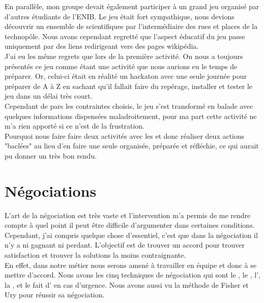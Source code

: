 {En parallèle, mon groupe devait également participer à un grand jeu organisé par d'autres étudiants de l'ENIB. Le jeu était fort sympathique, nous devions découvrir un ensemble de scientifiques par l'intermédiaire des rues et places de la technopôle. Nous avons cependant regretté que l'aspect éducatif du jeu passe uniquement par des liens redirigeant vers des pages wikipédia.\\

J'ai eu les même regrets que lors de la première activité. On nous a toujours présentés ce jeu comme étant une activité que nous aurions eu le temps de préparer. Or, celui-ci était en réalité un hackaton avec une seule journée pour préparer de A à Z en sachant qu'il fallait faire du repérage, installer et tester le jeu dans un délai très court.\\
Cependant de pars les contraintes choisis, le jeu s'est transformé en balade avec quelques informations dispensées maladroitement, pour ma part cette activité ne m'a rien apporté si ce n'est de la frustration.\\

Pourquoi nous faire faire deux activités avec les \pd et donc réaliser deux actions "baclées" au lieu d'en faire une seule organisée, préparée et réfléchie, ce qui aurait pu donner un très bon rendu.\\





\section{Négociations}

L'art de la négociation est très vaste et l'intervention m'a permis de me rendre compte à quel point il peut être difficile d'argumenter dans certaines conditions.\\
Cependant, j'ai compris quelque chose d'essentiel, c'est que dans la négociation il n'y a ni gagnant ni perdant. L'objectif est de trouver un accord pour trouver satisfaction et trouver la solutions la moins contraignante.\\

En effet, dans notre métier nous serons amené à travailler en équipe et donc à se mettre d'accord.
Nous avons les cinq techniques de négociation qui sont le , le , l', la , et le fait d' en cas d'urgence. Nous avons aussi vu la méthode de Fisher et Ury pour réussir sa négociation.\\

}
